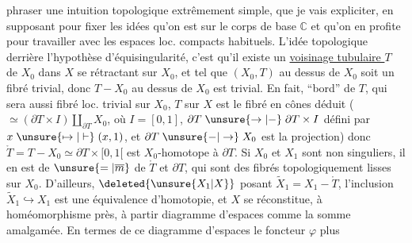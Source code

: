 %
phraser une intuition topologique extrêmement simple, que je vais expliciter, en supposant pour fixer les idées qu'on est sur le corps de base $\mathbb C$ et qu'on en profite pour travailler avec les espaces loc. compacts habituels. L'idée topologique derrière l'hypothèse d'équisingularité, c'est qu'il existe un \uline{voisinage tubulaire $T$} de $X_0$ dans $X$ se rétractant sur $X_0$, et tel que $(X_0,T)$ au dessus de $X_0$ soit un fibré  trivial, donc $T-X_0$ au dessus de $X_0$ est  trivial. En fait,   ``bord'' de $T$, qui sera aussi fibré loc. trivial sur $X_0$, $T$ sur $X$ est le fibré en cônes déduit ($\simeq(\partial T\times I)\amalg_{\partial T}X_0$, où $I=[0,1]$, $\partial T\mathrel{\unsure{\to|-}}\partial T\times I$ défini par $x\mathrel{\unsure{\mapsto|\vdash}}(x,1)$, et $\partial T\mathrel{\unsure{-|\to}}X_0$ est la projection) donc $\mathring T=T-X_0\simeq\partial T\times[0,1[$ est $X_0$-homotope à $\partial T$. Si $X_0$ et $X_1$ sont non singuliers, il en est de $\unsure{=|\overline m}$ de $\mathring T$ et $\partial T$, qui sont des fibrés topologiquement lisses sur $X_0$. D'ailleurs, $\deleted{\unsure{X_1|X}}$ posant $\widetilde X_1=X_1-\mathring T$,  l'inclusion $\widetilde X_1\hookrightarrow X_1$ est une équivalence d'homotopie, et $X$ se réconstitue, à homéomorphisme près, à partir  diagramme d'espaces
comme la somme amalgamée. En termes de ce diagramme d'espaces\unsure{;|,} le foncteur $\varphi$ plus

